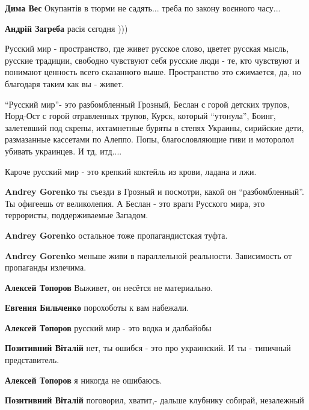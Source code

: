 \begin{itemize}
\begin{itemize}
\textbf{Дима Вес} Окупантів в тюрми не садять... треба по закону воєнного часу...

\textbf{Андрій Загреба} расія сєгодня )))

\end{itemize} %


Русский мир - пространство, где живет русское слово, цветет русская мысль,
русские традиции, свободно чувствуют себя русские люди - те, кто чувствуют и
понимают ценность всего сказанного выше. Пространство это сжимается, да, но
благодаря таким как вы - живет.

\begin{itemize} %

\enquote{Русский мир}- это разбомбленный Грозный, Беслан с горой детских трупов,
Норд-Ост с горой отравленных трупов, Курск, который \enquote{утонула}, Боинг,
залетевший под скрепы, ихтамнетные буряты в степях Украины, сирийские дети,
размазанные кассетами по Алеппо. Попы, благословляющие гиви и моторолол убивать
украинцев. И тд, итд....

Кароче русский мир - это крепкий коктейль из крови, ладана и лжи.


\textbf{Andrey Gorenko} ты съезди в Грозный и посмотри, какой он \enquote{разбомбленный}. Ты офигеешь от великолепия.
А Беслан - это враги Русского мира, это террористы, поддерживаемые Западом.

\textbf{Andrey Gorenko} остальное тоже пропагандистская туфта.

\textbf{Andrey Gorenko} меньше живи в параллельной реальности. Зависимость от пропаганды излечима.

\textbf{Алексей Топоров} Выживет, он несётся не материально.

\textbf{Евгения Бильченко} порохоботы к вам набежали.

\textbf{Алексей Топоров} русский мир - это водка и далбайобы

\textbf{Позитивний Віталій} нет, ты ошибся - это про украинский. И ты - типичный представитель.

\textbf{Алексей Топоров} я никогда не ошибаюсь.

\textbf{Позитивний Віталій} поговорил, хватит,- дальше клубнику собирай, незалежный


\end{itemize}
\end{itemize}
